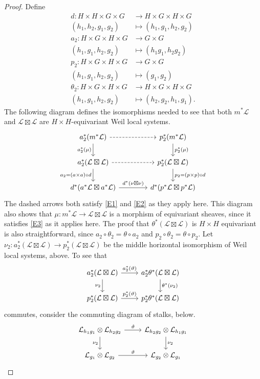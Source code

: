 \documentclass[10pt]{amsart}
\theoremstyle{plain}
\theoremstyle{definition}
\newcommand{\cs}[1]{{\mathcal{#1}}}
\begin{document}
\begin{proof} 
Define
\begin{align*}
d : H\times H\times G\times G &\to H\times G\times H\times G \\
(h_1,h_2,g_1,g_2) &\mapsto (h_1, g_1, h_2, g_2)\\
a_2 : H\times G\times H\times G &\to G\times G \\
(h_1,g_1,h_2,g_2) &\mapsto (h_1g_1, h_2g_2) \\
p_2 : H\times G\times H\times G &\to G\times G \\
(h_1,g_1,h_2,g_2) &\mapsto ( g_1,g_2) \\
\theta_2 : H \times G \times H \times G &\to H \times G \times H \times G \\
(h_1,g_1,h_2,g_2) &\mapsto (h_2,g_2,h_1,g_1).
\end{align*}
The following diagram defines the isomorphisms needed to see that both $m^*\cs{L}$ and $\cs{L}\boxtimes\cs{L}$ are $H\times H$-equivariant Weil local systems.
\[
\begin{tikzcd}[column sep=40]
\arrow{d}[swap]{a_2^*(\mu)} a_2^* (m^*\cs{L}) \arrow[dashed]{r} 
	& \arrow{d}{p_2^*(\mu)} p_2^*(m^*\cs{L})\\
\arrow{d}[swap]{a_2= (a\times a)\circ d} a_2^*(\cs{L}\boxtimes\cs{L}) \arrow[dashed]{r} 
	& \arrow{d}{p_2= (p\times p)\circ d} p_2^*(\cs{L}\boxtimes\cs{L}) \\
d^* (a^*\cs{L}\boxtimes a^*\cs{L}) \arrow{r}{d^*(\nu\boxtimes \nu)}& d^*(p^*\cs{L}\boxtimes p^*\cs{L}) 
\end{tikzcd}
\]
The dashed arrows both satisfy \eqref{E1} and \eqref{E2} as they apply here.
This diagram also shows that $\mu : m^*\cs{L} \to \cs{L}\boxtimes \cs{L}$ is a morphism of equivariant sheaves, since it satisfies \eqref{E3} as it applies here.
The proof that $\theta^*(\cs{L}\boxtimes\cs{L})$ is $H\times H$ equivariant is also straightforward, since $a_2\circ \theta_2 = \theta \circ a_2$ and $p_2\circ \theta_2 = \theta \circ p_2$.
Let $\nu_2 : a_2^*(\cs{L}\boxtimes\cs{L}) \to p_2^*(\cs{L}\boxtimes\cs{L})$ be the middle horizontal isomorphism of Weil local systems, above. 
To see that
\[
\begin{tikzcd}
a_2^*(\cs{L}\boxtimes\cs{L}) \arrow{r}{a_2^*(\vartheta)} \arrow{d}[swap]{\nu_2} 
	& a_2^*\theta^*(\cs{L}\boxtimes\cs{L}) \arrow{d}{\theta^*(\nu_2)} \\
p_2^*(\cs{L}\boxtimes\cs{L}) \arrow{r}{p_2^*(\vartheta)} 
	& p_2^*\theta^*(\cs{L}\boxtimes\cs{L})
\end{tikzcd}
\]
commutes, consider the commuting diagram of stalks, below.
\[
\begin{tikzcd}
\cs{L}_{h_1g_1}\otimes\cs{L}_{h_2g_2} \arrow{r}{\vartheta}  \arrow{d}[swap]{\nu_2} 
	& \cs{L}_{h_2g_2} \otimes\cs{L}_{h_1g_1}  \arrow{d}{\nu_2} \\
\cs{L}_{g_1}\otimes\cs{L}_{g_2} \arrow{r}{\vartheta}  
	& \cs{L}_{g_2} \otimes\cs{L}_{g_1}
\end{tikzcd}
\]
\end{proof}
\end{document}
